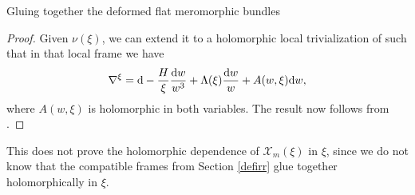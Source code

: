 \begin{subsubsection}{Gluing together the deformed flat meromorphic bundles}
\begin{proof}
Given $\nu(\xi)$, we can extend it to a holomorphic local trivialization of  such that in that local frame we have
\begin{equation*}
 \nabla^{\xi}= {\rm d} -\frac{H}{\xi}\frac{{\rm d}w}{w^3}+\Lambda(\xi)\frac{{\rm d}w}{w} + A(w,\xi){\rm d}w,
\end{equation*}
where $A(w,\xi)$ is holomorphic in both variables. The result now follows from \cite[Lemma~7 and Corollary~8]{B2}.
\end{proof}

This does not prove the holomorphic dependence of $\mathcal{X}_m(\xi)$ in $\xi$, since we do not know that the compatible frames  from Section \ref{defirr} glue together holomorphically in $\xi$.
\end{subsubsection}

